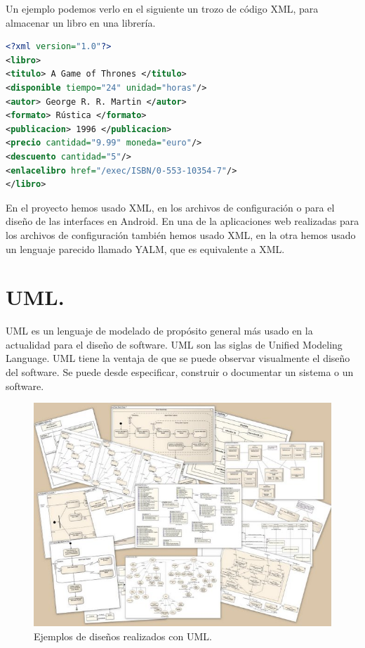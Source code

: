Un ejemplo podemos verlo en el siguiente un trozo de código XML, para almacenar un libro en una librería.

\begin{lstlisting}[language=XML]   
<?xml version="1.0"?>
<libro>
<titulo> A Game of Thrones </titulo>
<disponible tiempo="24" unidad="horas"/>
<autor> George R. R. Martin </autor>
<formato> Rústica </formato>
<publicacion> 1996 </publicacion>
<precio cantidad="9.99" moneda="euro"/>
<descuento cantidad="5"/>
<enlacelibro href="/exec/ISBN/0-553-10354-7"/>
</libro>
\end{lstlisting}

En el proyecto hemos usado XML, en los archivos de configuración o para el diseño de las interfaces en Android. En una de la aplicaciones web realizadas para los archivos de configuración también hemos usado XML, en la otra hemos usado un lenguaje parecido llamado YALM, que es equivalente a XML.

\section{UML.}

UML es un lenguaje de modelado de propósito general más usado en la actualidad para el diseño de software. UML son las siglas de Unified Modeling Language. UML tiene la ventaja de que se puede observar visualmente el diseño del software. Se puede desde especificar, construir o documentar un sistema o un software.

\begin{figure}
  \centering
    \includegraphics[scale=0.4]{./ConocimientosPrevios/imagenes/UMLDiagrams.jpg}
  \caption{Ejemplos de diseños realizados con UML.}
  \label{fig:UMLDiagrams}
\end{figure}


